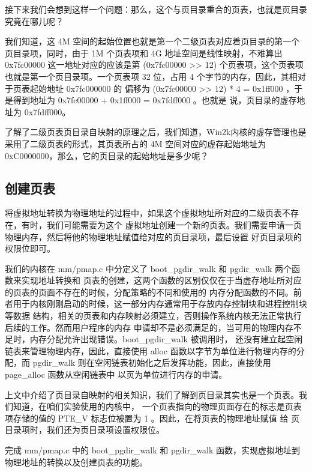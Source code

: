 接下来我们会想到这样一个问题：那么，这个与页目录重合的页表，也就是页目录究竟在哪儿呢？

我们知道，这 4M 空间的起始位置也就是第一个二级页表对应着页目录的第一个页目录项，同时，由于 1M 个页表项和 4G 
地址空间是线性映射，不难算出 0x7fc00000 这一地址对应的应该是第 (0x7fc00000 >> 12) 个页表项，这个页表项
也就是第一个页目录项。一个页表项 32 位，占用 4 个字节的内存，因此，其相对于页表起始地址 0x7fc000000 的
偏移为 (0x7fc00000 >> 12) * 4 = 0x1ff000 ，于是得到地址为 0x7fc00000 + 0x1ff000 = 0x7fdff000 。也就是
说，页目录的虚存地址为 0x7fdff000。

\begin{thinking}\label{think-windows_pde_addr}
了解了二级页表页目录自映射的原理之后，我们知道，Win2k内核的虚存管理也是采用了二级页表的形式，其页表所占的 4M
空间对应的虚存起始地址为 0xC0000000，那么，它的页目录的起始地址是多少呢？
\end{thinking}

\subsection{创建页表}

将虚拟地址转换为物理地址的过程中，如果这个虚拟地址所对应的二级页表不存在，有时，我们可能需要为这个
虚拟地址创建一个新的页表。我们需要申请一页物理内存，然后将他的物理地址赋值给对应的页目录项，最后设置
好页目录项的权限位即可。

我们的内核在 mm/pmap.c 中分定义了 boot\_pgdir\_walk 和 pgdir\_walk 两个函数来实现地址转换和
页表的创建，这两个函数的区别仅仅在于当虚存地址所对应的页表的页面不存在的时候，分配策略的不同和使用的
内存分配函数的不同。前者用于内核刚刚启动的时候，这一部分内存通常用于存放内存控制块和进程控制块等数据
结构，相关的页表和内存映射必须建立，否则操作系统内核无法正常执行后续的工作。然而用户程序的内存
申请却不是必须满足的，当可用的物理内存不足时，内存分配允许出现错误。boot\_pgdir\_walk 被调用时，
还没有建立起空闲链表来管理物理内存，因此，直接使用 alloc 函数以字节为单位进行物理内存的分配，而
 pgdir\_walk 则在空闲链表初始化之后发挥功能，因此，直接使用 page\_alloc 函数从空闲链表中
以页为单位进行内存的申请。

上文中介绍了页目录自映射的相关知识，我们了解到页目录其实也是一个页表。我们知道，在咱们实验使用的内核中，
一个页表指向的物理页面存在的标志是页表项存储的值的 PTE\_V 标志位被置为 1 。因此，在将页表的物理地址赋值
给 页目录项时，我们还为页目录项设置权限位。

\begin{exercise}
完成 mm/pmap.c 中的 boot\_pgdir\_walk 和 pgdir\_walk 函数，实现虚拟地址到物理地址的转换以及创建页表的功能。
\end{exercise}

